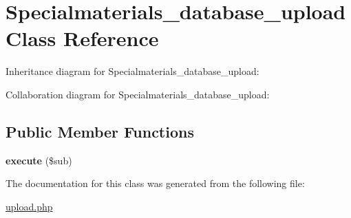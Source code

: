 \hypertarget{classSpecialmaterials__database__upload}{\section{Specialmaterials\+\_\+database\+\_\+upload Class Reference}
\label{classSpecialmaterials__database__upload}
}


Inheritance diagram for Specialmaterials\+\_\+database\+\_\+upload\+:


Collaboration diagram for Specialmaterials\+\_\+database\+\_\+upload\+:
\subsection*{Public Member Functions}
\begin{DoxyCompactItemize}
\item 
\hypertarget{classSpecialmaterials__database__upload_a23d73930ff0965aa1fe2ddd0f6599234}{{\bfseries execute} (\$sub)}\label{classSpecialmaterials__database__upload_a23d73930ff0965aa1fe2ddd0f6599234}

\end{DoxyCompactItemize}


The documentation for this class was generated from the following file\+:\begin{DoxyCompactItemize}
\item 
\hyperlink{upload_8php}{upload.\+php}\end{DoxyCompactItemize}
